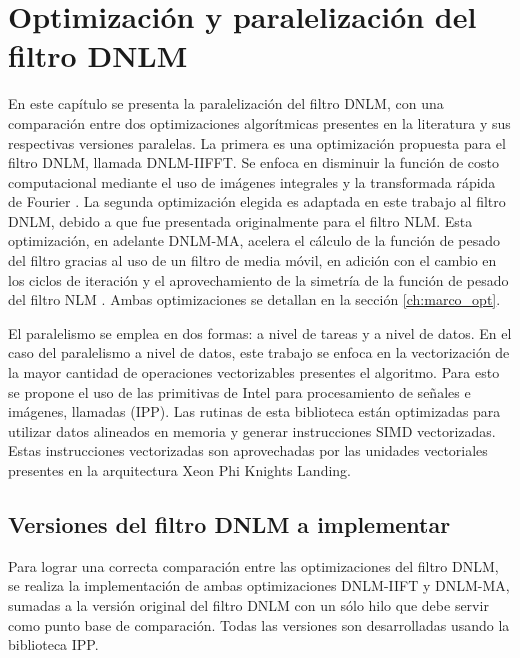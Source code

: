 \chapter{Optimización y paralelización del filtro DNLM}
\label{ch:solucion}

En este capítulo se presenta la paralelización del filtro DNLM, con una comparación entre dos optimizaciones algorítmicas presentes en la literatura y sus respectivas versiones paralelas. La primera es una optimización propuesta para el filtro DNLM, llamada DNLM-IIFFT. Se enfoca en disminuir la función de costo computacional mediante el uso de imágenes integrales y la transformada rápida de Fourier \cite{CalderonRamirez2017}. La segunda optimización elegida es adaptada en este trabajo al filtro DNLM, debido a que fue presentada originalmente para el filtro NLM. Esta optimización, en adelante DNLM-MA, acelera el cálculo de la función de pesado del filtro gracias al uso de un filtro de media móvil, en adición con el cambio en los ciclos de iteración y el aprovechamiento de la simetría de la función de pesado del filtro NLM \cite{Condat2010}. Ambas optimizaciones se detallan en la sección \ref{ch:marco_opt}.

El paralelismo se emplea en dos formas: a nivel de tareas y a nivel de datos. En el caso del paralelismo a nivel de datos, este trabajo se enfoca en la vectorización de la mayor cantidad de operaciones vectorizables presentes el algoritmo. Para esto se propone el uso de las primitivas de Intel para procesamiento de se\~nales e imágenes, llamadas  (IPP). Las rutinas de esta biblioteca están optimizadas para utilizar datos alineados en memoria y generar instrucciones SIMD vectorizadas. Estas instrucciones vectorizadas son aprovechadas por las unidades vectoriales presentes en la arquitectura Xeon Phi Knights Landing.



\section{Versiones del filtro DNLM a implementar}

Para lograr una correcta comparación entre las optimizaciones del filtro DNLM, se realiza la implementación de ambas optimizaciones DNLM-IIFT y DNLM-MA, sumadas a la versión original del filtro DNLM con un sólo hilo que debe servir como punto base de comparación. Todas las versiones son desarrolladas usando la biblioteca IPP.

